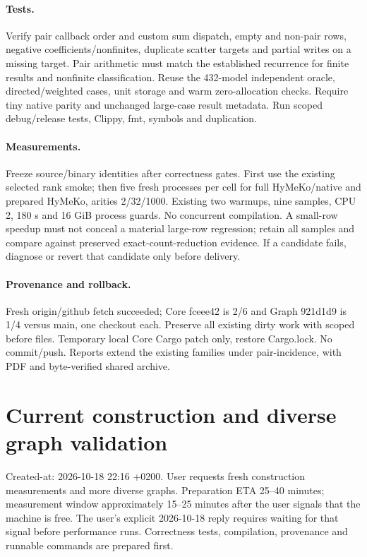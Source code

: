\documentclass[11pt]{article}
\begin{document}
\paragraph{Tests.} Verify pair callback order and custom sum dispatch, empty and
non-pair rows, negative coefficients/nonfinites, duplicate scatter targets and
partial writes on a missing target. Pair arithmetic must match the established
recurrence for finite results and nonfinite classification. Reuse the 432-model
independent oracle, directed/weighted cases, unit storage and warm zero-allocation
checks. Require tiny native parity and unchanged large-case result metadata.
Run scoped debug/release tests, Clippy, fmt, symbols and duplication.
\paragraph{Measurements.} Freeze source/binary identities after correctness gates.
First use the existing selected rank smoke; then five fresh processes per cell
for full HyMeKo/native and prepared HyMeKo, arities 2/32/1000. Existing two warmups,
nine samples, CPU 2, 180 s and 16 GiB process guards. No concurrent compilation.
A small-row speedup must not conceal a material large-row regression; retain all
samples and compare against preserved exact-count-reduction evidence. If a
candidate fails, diagnose or revert that candidate only before delivery.
\paragraph{Provenance and rollback.} Fresh origin/github fetch succeeded; Core
fceee42 is 2/6 and Graph 921d1d9 is 1/4 versus main, one checkout each. Preserve
all existing dirty work with scoped before files. Temporary local Core Cargo
patch only, restore Cargo.lock. No commit/push. Reports extend the existing
families under pair-incidence, with PDF and byte-verified shared archive.


\newpage\section*{Current construction and diverse graph validation}
Created-at: 2026-10-18 22:16 +0200. User requests fresh construction measurements and more diverse
graphs. Preparation ETA 25--40 minutes; measurement window approximately 15--25
minutes after the user signals that the machine is free. The user's explicit
2026-10-18 reply requires waiting for that signal before performance runs.
Correctness tests, compilation, provenance and runnable commands are prepared first.
\end{document}
